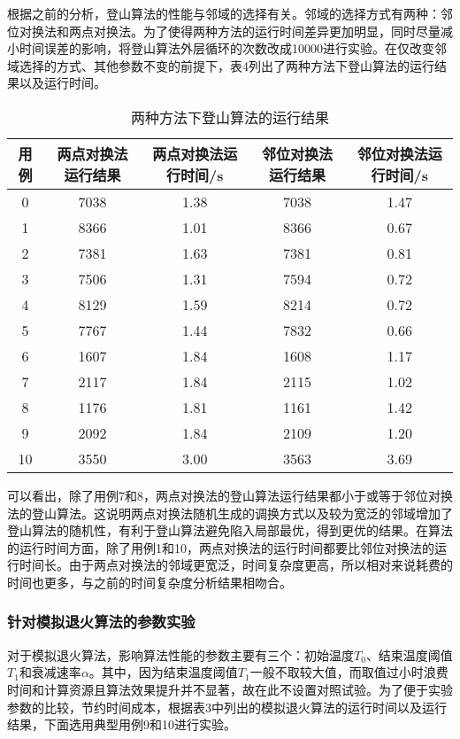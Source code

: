 \documentclass[UTF8]{ctexart}
\begin{document}
根据之前的分析，登山算法的性能与邻域的选择有关。邻域的选择方式有两种：邻位对换法和两点对换法。为了使得两种方法的运行时间差异更加明显，同时尽量减小时间误差的影响，将登山算法外层循环的次数改成10000进行实验。在仅改变邻域选择的方式、其他参数不变的前提下，表4列出了两种方法下登山算法的运行结果以及运行时间。

\begin{table} 
	\centering
	\caption{两种方法下登山算法的运行结果}
	\begin{tabular}{ccccc} %
		
		\toprule %
用例 & 两点对换法运行结果 & 两点对换法运行时间/s & 邻位对换法运行结果 &
邻位对换法运行时间/s \\
		\hline %
0 & 7038 & 1.38 & 7038 & 1.47 \\
1 & 8366 & 1.01 & 8366 & 0.67 \\
2 & 7381 & 1.63 & 7381 & 0.81 \\
3 & 7506 & 1.31 & 7594 & 0.72 \\
4 & 8129 & 1.59 & 8214 & 0.72 \\
5 & 7767 & 1.44 & 7832 & 0.66 \\
6 & 1607 & 1.84 & 1608 & 1.17 \\
7 & 2117 & 1.84 & 2115 & 1.02 \\
8 & 1176 & 1.81 & 1161 & 1.42 \\
9 & 2092 & 1.84 & 2109 & 1.20 \\
10 & 3550 & 3.00 & 3563 & 3.69 \\
		\bottomrule %
	\end{tabular}
\end{table}

可以看出，除了用例7和8，两点对换法的登山算法运行结果都小于或等于邻位对换法的登山算法。这说明两点对换法随机生成的调换方式以及较为宽泛的邻域增加了登山算法的随机性，有利于登山算法避免陷入局部最优，得到更优的结果。在算法的运行时间方面，除了用例1和10，两点对换法的运行时间都要比邻位对换法的运行时间长。由于两点对换法的邻域更宽泛，时间复杂度更高，所以相对来说耗费的时间也更多，与之前的时间复杂度分析结果相吻合。

\subsubsection{针对模拟退火算法的参数实验}
对于模拟退火算法，影响算法性能的参数主要有三个：初始温度\(T_0\)、结束温度阈值\(T_1\)和衰减速率\(\alpha\)。其中，因为结束温度阈值\(T_1\)一般不取较大值，而取值过小时浪费时间和计算资源且算法效果提升并不显著，故在此不设置对照试验。为了便于实验参数的比较，节约时间成本，根据表3中列出的模拟退火算法的运行时间以及运行结果，下面选用典型用例9和10进行实验。
\end{document}
